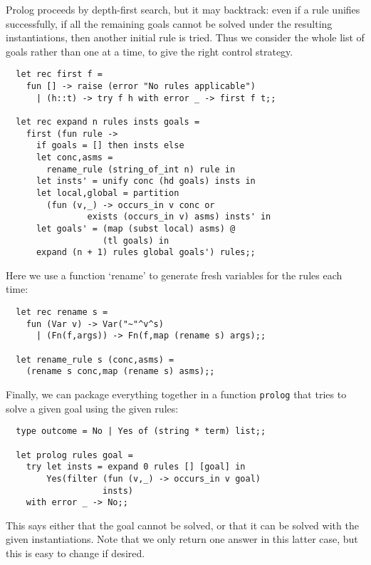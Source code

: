 Prolog proceeds by depth-first search, but it may backtrack: even if a rule
unifies successfully, if all the remaining goals cannot be solved under the
resulting instantiations, then another initial rule is tried. Thus we consider
the whole list of goals rather than one at a time, to give the right control
strategy.

\begin{boxed}\begin{lstlisting}
  let rec first f =
    fun [] -> raise (error "No rules applicable")
      | (h::t) -> try f h with error _ -> first f t;;

  let rec expand n rules insts goals =
    first (fun rule ->
      if goals = [] then insts else
      let conc,asms =
        rename_rule (string_of_int n) rule in
      let insts' = unify conc (hd goals) insts in
      let local,global = partition
        (fun (v,_) -> occurs_in v conc or
                exists (occurs_in v) asms) insts' in
      let goals' = (map (subst local) asms) @
                   (tl goals) in
      expand (n + 1) rules global goals') rules;;
\end{lstlisting}\end{boxed}

Here we use a function `rename' to generate fresh variables for the rules each
time:

\begin{boxed}\begin{verbatim}
  let rec rename s =
    fun (Var v) -> Var("~"^v^s)
      | (Fn(f,args)) -> Fn(f,map (rename s) args);;

  let rename_rule s (conc,asms) =
    (rename s conc,map (rename s) asms);;
\end{verbatim}\end{boxed}

Finally, we can package everything together in a function {\tt prolog} that
tries to solve a given goal using the given rules:

\begin{boxed}\begin{verbatim}
  type outcome = No | Yes of (string * term) list;;

  let prolog rules goal =
    try let insts = expand 0 rules [] [goal] in
        Yes(filter (fun (v,_) -> occurs_in v goal)
                   insts)
    with error _ -> No;;
\end{verbatim}\end{boxed}

This says either that the goal cannot be solved, or that it can be solved with
the given instantiations. Note that we only return one answer in this latter
case, but this is easy to change if desired.

